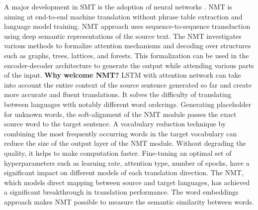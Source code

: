\documentclass[manuscript,screen]{acmart}
\begin{document}
A major development in SMT is the adoption of neural networks \cite{koehn2017neural}. NMT is aiming at end-to-end machine translation without phrase table extraction and language model training.
NMT approach uses sequence-to-sequence transduction using deep semantic representations of the source text. The NMT investigates various methods to formalize attention mechanisms and decoding over structures such as graphs, trees, lattices, and forests. This formalization can be used in the encoder-decoder architecture to generate the output while attending various parts of the input. \textbf{Why welcome NMT?} LSTM with attention network can take into account the entire context of the source sentence generated so far and create more accurate and fluent translations. It solves the difficulty of translating between languages with notably different word orderings. Generating placeholder for unknown words, the soft-alignment of the NMT module passes the exact source word to the target sentence. A vocabulary reduction technique by combining the most frequently occurring words in the target vocabulary can reduce the size of the output layer of the NMT module. Without degrading the quality, it helps to make computation faster. Fine-tuning an optimal set of hyperparameters such as learning rate, attention type, number of epochs, have a significant impact on different models of each translation direction. The NMT, which models direct mapping between source and target languages, has achieved a significant breakthrough in translation performance. The word embeddings approach makes NMT possible to measure the semantic similarity between words.
\end{document}
